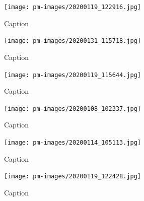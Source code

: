 \begin{figure}[]
\centering
\texttt{[image: pm-images/20200119\_122916.jpg]}
\caption{Caption}
\end{figure}

        \clearpage
        
\begin{figure}[]
\centering
\texttt{[image: pm-images/20200131\_115718.jpg]}
\caption{Caption}
\end{figure}

        \clearpage
        
\begin{figure}[]
\centering
\texttt{[image: pm-images/20200119\_115644.jpg]}
\caption{Caption}
\end{figure}

        \clearpage
        
\begin{figure}[]
\centering
\texttt{[image: pm-images/20200108\_102337.jpg]}
\caption{Caption}
\end{figure}

        \clearpage
        
\begin{figure}[]
\centering
\texttt{[image: pm-images/20200114\_105113.jpg]}
\caption{Caption}
\end{figure}

        \clearpage
        
\begin{figure}[]
\centering
\texttt{[image: pm-images/20200119\_122428.jpg]}
\caption{Caption}
\end{figure}

        \clearpage
        
